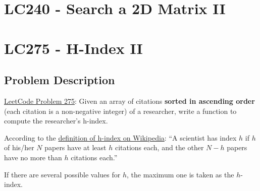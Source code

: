 \documentclass[justified]{tufte-book}
\begin{document}
\section{LC240 - Search a 2D Matrix II} \label{sec:lc240_search_2d_matrix_ii}

\section{LC275  - H-Index II} \label{sec:lc275_h_index_ii}
\subsection{Problem Description}
\href{https://leetcode.com/problems/h-index-ii/}{LeetCode Problem 275}: Given an array of citations \textbf{sorted in ascending order} (each citation is a non-negative integer) of a researcher, write a function to compute the researcher's h-index.

According to the \href{https://en.wikipedia.org/wiki/H-index}{definition of h-index on Wikipedia}: ``A scientist has index $h$ if $h$ of his/her $N$ papers have at least $h$ citations each, and the other $N - h$ papers have no more than $h$ citations each.'' 

If there are several possible values for $h$, the maximum one is taken as the $h$-index.
\end{document}
